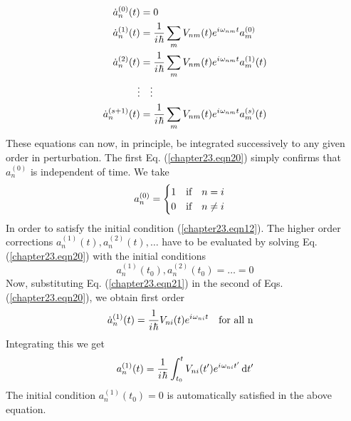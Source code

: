 \begin{align}
\label{chapter23.eqn20}
\begin{split}
\dot{a}_n^{(0)}(t) &= 0 \\
\dot{a}_n^{(1)}(t) &= \frac{1}{{i\mkern1mu} \hbar} \sum_{m} V_{n m}(t) e^{{i\mkern1mu} \omega_{n m} t} a_{m}^{(0)} \\
\dot{a}_n^{(2)}(t) &= \frac{1}{{i\mkern1mu} \hbar} \sum_{m} V_{n m}(t) e^{{i\mkern1mu} \omega_{n m} t} a_{m}^{(1)}(t) \\
\vdots & \quad \vdots \\
\dot{a}_n^{(s+1)}(t) &= \frac{1}{{i\mkern1mu} \hbar} \sum_{m} V_{n m}(t) e^{{i\mkern1mu} \omega_{n m} t} a_{m}^{(s)}(t) \\
\end{split}
\end{align}
These equations can now, in principle, be integrated successively to any given order in perturbation. The first Eq. (\ref{chapter23.eqn20}) simply confirms that $a_n^{(0)}$ is independent of time. We take
\begin{equation}
\label{chapter23.eqn21}
a_n^{(0)} = 
\begin{cases}
1 \qq{if} n = i \\
0 \qq{if} n \neq i
\end{cases}
\end{equation}
In order to satisfy the initial condition (\ref{chapter23.eqn12}). The higher order corrections $a_n^{(1)}(t), a_n^{(2)}(t), \ldots$ have to be evaluated by solving Eq. (\ref{chapter23.eqn20}) with the initial conditions
\begin{equation}
\label{chapter23.eqn22}
	a_n^{(1)}(t_0), a_n^{(2)}(t_0) = \ldots = 0
\end{equation}
Now, substituting Eq. (\ref{chapter23.eqn21})  in the second of Eqs. (\ref{chapter23.eqn20}), we obtain first order
\begin{equation}
\label{chapter23.eqn23}
\dot{a}_n^{(1)}(t) = \frac{1}{\iu \hbar} V_{n i}(t) e^{\iu \omega_{n i} t} \qq{for all n}
\end{equation}
Integrating this we get
\begin{equation}
\label{chapter23.eqn24}
a_n^{(1)}(t) = \frac{1}{{i\mkern1mu} \hbar} \int_{t_0}^{t} V_{n i}(t^\prime) e^{{i\mkern1mu} \omega_{n i} t^\prime} \dd{t^\prime}
\end{equation}
The initial condition $a_n^{(1)}(t_0) = 0$ is automatically satisfied in the above equation.


